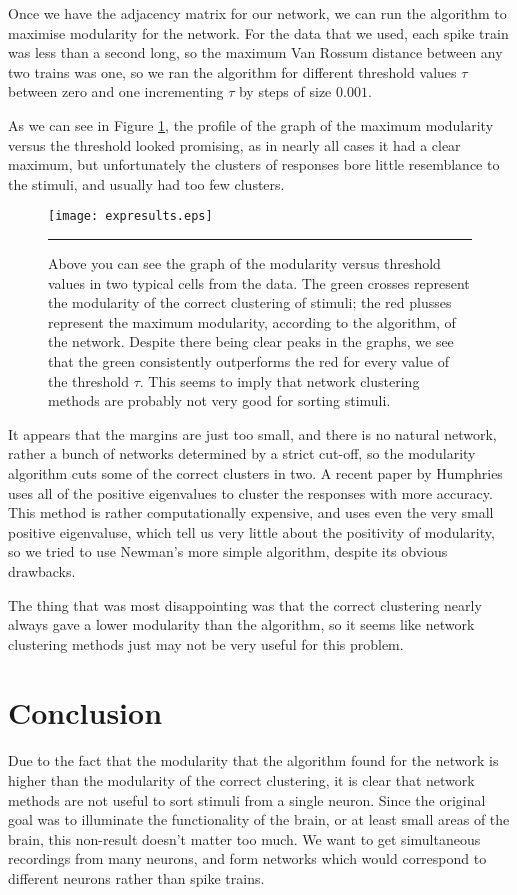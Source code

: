 \documentclass[a4paper,12pt]{report}
\begin{document}
Once we have the adjacency matrix for our network, we can run the algorithm to 
maximise modularity for the network.  For the data that we used, 
each spike train was less than a second long, so the maximum Van Rossum 
distance between any two trains was one, so we ran the algorithm for different 
threshold values $\tau$ between zero and one incrementing $\tau$ by steps of 
size $0.001$.

As we can see in Figure \ref{graphs}, the profile of the graph of the maximum 
modularity versus the threshold looked promising, as in nearly all cases it had 
a clear maximum, but unfortunately the clusters of responses bore little 
resemblance to the stimuli, and usually had too few clusters.

\begin{figure}[thb]
  \centering
  \texttt{[image: expresults.eps]}
  \rule{35em}{0.5pt}
  \caption{Above you can see the graph of the modularity versus threshold values
    in two typical cells from the data.  The green crosses represent the 
    modularity of the correct clustering of stimuli; the red plusses represent 
    the maximum modularity, according to the algorithm, of the network.
    Despite there being clear peaks in the graphs, we see that the green 
    consistently outperforms the red for every value of the threshold $\tau$.  
    This seems to imply that network clustering methods are probably not very 
    good for sorting stimuli.}
  \label{graphs}
\end{figure}

It appears that the margins are just too small, and there is no natural 
network, rather a bunch of networks determined by a strict cut-off, so the 
modularity algorithm cuts some of the correct clusters in two.  A recent paper 
by Humphries \cite{Humphries2011a} uses all of the positive eigenvalues to 
cluster the responses with more accuracy. This method is 
rather computationally expensive, and uses even the very small positive 
eigenvaluse, which tell us very little about the positivity of modularity, so 
we tried to use Newman's more simple algorithm, despite its obvious drawbacks.

The thing that was most disappointing was that the correct clustering nearly 
always gave a lower modularity than the algorithm, so it seems like network 
clustering methods just may not be very useful for this problem.

\chapter{Conclusion}
Due to the fact that the modularity that the algorithm found for the network is 
higher than the modularity of the correct clustering, it is clear that network 
methods are not useful to sort stimuli from a single neuron.  Since the 
original goal was to illuminate the functionality of the brain, or at least 
small areas of the brain, this non-result doesn't matter too much.  We want to 
get simultaneous recordings from many neurons, and form networks which would 
correspond to different neurons rather than spike trains.
\end{document}
